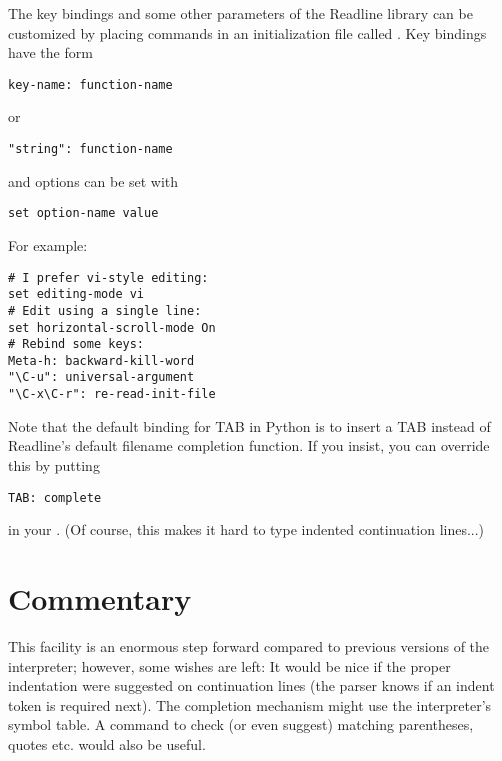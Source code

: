 \documentclass{manual}
\begin{document}
The key bindings and some other parameters of the Readline library can
be customized by placing commands in an initialization file called
.  Key bindings have the form

\begin{verbatim}
key-name: function-name
\end{verbatim}

or

\begin{verbatim}
"string": function-name
\end{verbatim}

and options can be set with

\begin{verbatim}
set option-name value
\end{verbatim}

For example:

\begin{verbatim}
# I prefer vi-style editing:
set editing-mode vi
# Edit using a single line:
set horizontal-scroll-mode On
# Rebind some keys:
Meta-h: backward-kill-word
"\C-u": universal-argument
"\C-x\C-r": re-read-init-file
\end{verbatim}

Note that the default binding for TAB in Python is to insert a TAB
instead of Readline's default filename completion function.  If you
insist, you can override this by putting

\begin{verbatim}
TAB: complete
\end{verbatim}

in your .  (Of course, this makes it hard to type
indented continuation lines...)

\section{Commentary}
\label{commentary}

This facility is an enormous step forward compared to previous
versions of the interpreter; however, some wishes are left: It would
be nice if the proper indentation were suggested on continuation lines
(the parser knows if an indent token is required next).  The
completion mechanism might use the interpreter's symbol table.  A
command to check (or even suggest) matching parentheses, quotes etc.
would also be useful.

\end{document}
